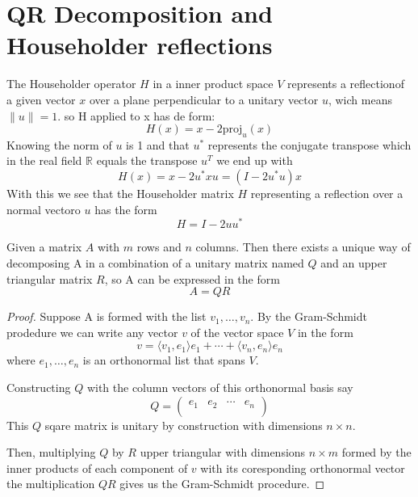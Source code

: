 \documentclass{scrartcl}
\begin{document}
\newpage

\section{QR Decomposition and Householder reflections}

\begin{definition}
The Householder operator $H$ in a inner product space $V$ represents a reflectionof a given vector $x$ over a plane perpendicular to a unitary vector $u$, wich means $\| u\| = 1$. so H applied to x has de form:
\[
  H(x) = x - 2\text{proj}_u(x)
\]
  Knowing the norm of $u$ is 1 and that $u^*$ represents the conjugate transpose which in the real field $\mathbb{R}$ equals the transpose $u^T$ we end up with
\[
  H(x) = x - 2 u^* x u = (I - 2 u^* u)x
\]
With this we see that the Householder matrix $H$ representing a reflection over a normal vectoro $u$ has the form
\[
  H = I - 2uu^*
\]
\end{definition}

\begin{definition}[QR Decomposition]
  Given a matrix $A$ with $m$ rows and $n$ columns. Then there exists a unique way of decomposing A in a combination of a unitary matrix named $Q$ and an upper triangular matrix $R$, so A can be expressed in the form
  \[
  A = QR
  \]
\end{definition}
\begin{proof}
  Suppose A is formed with the list $v_1,\ldots ,v_n$. By the Gram-Schmidt prodedure we can write any vector $v$ of the vector space $V$ in the form
  \[
  v = \langle v_1, e_1\rangle e_1 + \cdots + \langle v_n, e_n\rangle e_n
  \]
  where $e_1, \ldots ,e_n$ is an orthonormal list that spans $V$.

  Constructing $Q$ with the column vectors of this orthonormal basis say
  \[
  Q = \left( \begin{matrix}
                e_1 & e_2 & \cdots & e_n \\
             \end{matrix}
      \right)
  \]
  This $Q$ sqare matrix is unitary by construction with dimensions $n \times n$.

  Then, multiplying $Q$ by $R$ upper triangular with dimensions $n \times m$ formed by the inner products of each component of $v$ with its coresponding orthonormal vector the multiplication $QR$ gives us the Gram-Schmidt procedure.
\end{proof}
\end{document}
